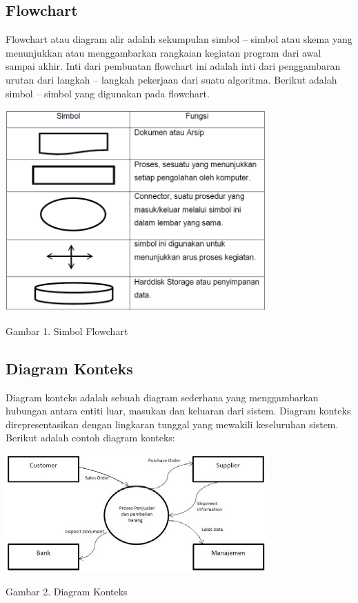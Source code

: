 \documentclass{jtetiproposalskripsi}
\begin{document}
\subsection{Flowchart}
Flowchart atau diagram alir adalah sekumpulan simbol – simbol atau skema yang menunjukkan atau menggambarkan rangkaian kegiatan program dari awal sampai akhir. Inti dari pembuatan flowchart ini adalah inti dari penggambaran urutan dari langkah – langkah pekerjaan dari suatu algoritma. Berikut adalah simbol – simbol yang digunakan pada flowchart.

\begin{center}
\includegraphics[width=10cm]{gambar/simbolflowchart.png} 

Gambar 1. Simbol Flowchart
\end{center}

\subsection{Diagram Konteks}
Diagram konteks adalah sebuah diagram sederhana yang menggambarkan hubungan antara entiti luar, masukan dan keluaran dari sistem. Diagram konteks direpresentasikan dengan lingkaran tunggal yang mewakili keseluruhan sistem. Berikut adalah contoh diagram konteks:

\begin{center}
\includegraphics[width=10cm]{gambar/diagramkonteks.png} 

Gambar 2. Diagram Konteks
\end{center}
\end{document}
